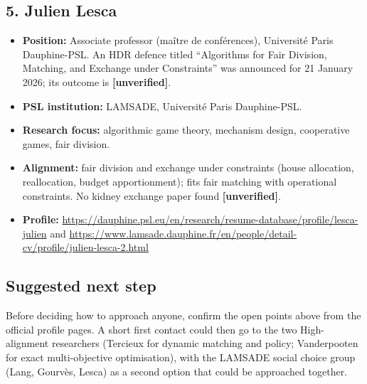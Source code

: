 \documentclass[10pt]{article}
\begin{document}
\subsection*{5. Julien Lesca}
\begin{itemize}
  \item \textbf{Position:} Associate professor (ma\^itre de conf\'erences), Universit\'e
        Paris Dauphine-PSL. An HDR defence titled ``Algorithms for Fair Division, Matching,
        and Exchange under Constraints'' was announced for 21 January 2026; its outcome is
        \textbf{[unverified]}.
  \item \textbf{PSL institution:} LAMSADE, Universit\'e Paris Dauphine-PSL.
  \item \textbf{Research focus:} algorithmic game theory, mechanism design, cooperative
        games, fair division.
  \item \textbf{Alignment:} fair division and exchange under constraints (house
        allocation, reallocation, budget apportionment); fits fair matching with
        operational constraints. No kidney exchange paper found \textbf{[unverified]}.
  \item \textbf{Profile:} \url{https://dauphine.psl.eu/en/research/resume-database/profile/lesca-julien}
        and \url{https://www.lamsade.dauphine.fr/en/people/detail-cv/profile/julien-lesca-2.html}
\end{itemize}

\subsection*{Suggested next step}
Before deciding how to approach anyone, confirm the open points above from the
official profile pages. A short first contact could then go to the two High-alignment
researchers (Tercieux for dynamic matching and policy; Vanderpooten for exact
multi-objective optimisation), with the LAMSADE social choice group (Lang, Gourv\`es,
Lesca) as a second option that could be approached together.
\end{document}
